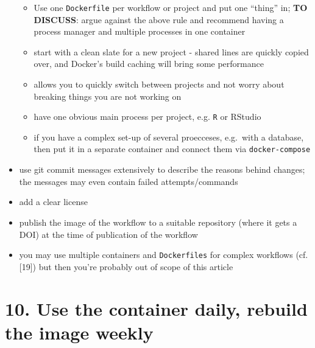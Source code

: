 \documentclass[10pt,letterpaper]{article}
\providecommand{\tightlist}{%
  \setlength{\itemsep}{0pt}\setlength{\parskip}{0pt}}
\begin{document}
\begin{itemize}
  \begin{itemize}
  \tightlist
  \item
    Use one \texttt{Dockerfile} per workflow or project and put one
    ``thing'' in; \textbf{TO DISCUSS}: argue against the above rule and
    recommend having a process manager and multiple processes in one
    container
  \item
    start with a clean slate for a new project - shared lines are
    quickly copied over, and Docker's build caching will bring some
    performance
  \item
    allows you to quickly switch between projects and not worry about
    breaking things you are not working on
  \item
    have one obvious main process per project, e.g. \texttt{R} or
    RStudio
  \item
    if you have a complex set-up of several proecceses, e.g.~with a
    database, then put it in a separate container and connect them via
    \texttt{docker-compose}
  \end{itemize}
\item
  use git commit messages extensively to describe the reasons behind
  changes; the messages may even contain failed attempts/commands
\item
  add a clear license
\item
  publish the image of the workflow to a suitable repository (where it
  gets a DOI) at the time of publication of the workflow
\item
  you may use multiple containers and \texttt{Dockerfiles} for complex
  workflows (cf. {[}19{]}) but then you're probably out of scope of this
  article
\end{itemize}

\hypertarget{use-the-container-daily-rebuild-the-image-weekly}{%
\section*{10. Use the container daily, rebuild the image
weekly}\label{use-the-container-daily-rebuild-the-image-weekly}}
\end{document}
